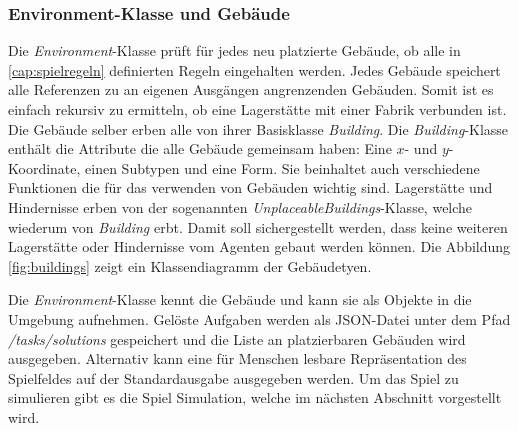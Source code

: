 \subsubsection*{Environment-Klasse und Gebäude}
Die \textit{Environment}-Klasse prüft für jedes neu platzierte Gebäude, ob alle in \ref{cap:spielregeln} definierten Regeln eingehalten werden. Jedes Gebäude speichert alle Referenzen zu an eigenen Ausgängen angrenzenden Gebäuden. Somit ist es einfach rekursiv zu ermitteln, ob eine Lagerstätte mit einer Fabrik verbunden ist.
Die Gebäude selber erben alle von ihrer Basisklasse \textit{Building}. Die \textit{Building}-Klasse enthält die Attribute die alle Gebäude gemeinsam haben: Eine $x$- und $y$-Koordinate, einen Subtypen und eine Form. Sie beinhaltet auch verschiedene Funktionen die für das verwenden von Gebäuden wichtig sind. Lagerstätte und Hindernisse erben von der sogenannten \textit{UnplaceableBuildings}-Klasse, welche wiederum von \textit{Building} erbt. Damit soll sichergestellt werden, dass keine weiteren Lagerstätte oder Hindernisse vom Agenten gebaut werden können. Die Abbildung \ref{fig:buildings} zeigt ein Klassendiagramm der Gebäudetyen.

Die \textit{Environment}-Klasse kennt die Gebäude und kann sie als Objekte in die Umgebung aufnehmen. 
Gelöste Aufgaben werden als JSON-Datei unter dem Pfad \\\textit{/tasks/solutions} gespeichert und die Liste an platzierbaren Gebäuden wird ausgegeben. Alternativ kann eine für Menschen lesbare Repräsentation des Spielfeldes auf der Standardausgabe ausgegeben werden.
Um das Spiel zu simulieren gibt es die Spiel Simulation, welche im nächsten Abschnitt vorgestellt wird.


